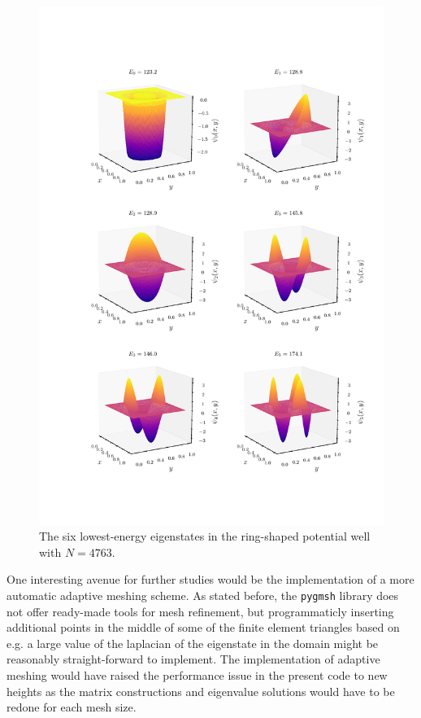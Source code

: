 \documentclass[a4paper,12pt]{article}
\begin{document}
\begin{figure}[H]
\centering
\vspace{-5cm}
\includegraphics[width=\textwidth]{../figs/eigenfuncs_circle.pdf}
\caption{The six lowest-energy eigenstates in the ring-shaped potential well with $N=4763$.}
\label{fig: circleEigFuncs}
\end{figure}

\cleardoublepage

One interesting avenue for further studies would be the implementation of a more automatic adaptive meshing scheme. As stated before, the \texttt{pygmsh} library does not offer ready-made tools for mesh refinement, but programmaticly inserting additional points in the middle of some of the finite element triangles based on e.g. a large value of the laplacian of the eigenstate in the domain might be reasonably straight-forward to implement. The implementation of adaptive meshing would have raised the performance issue in the present code to new heights as the matrix constructions and eigenvalue solutions would have to be redone for each mesh size.
\end{document}
